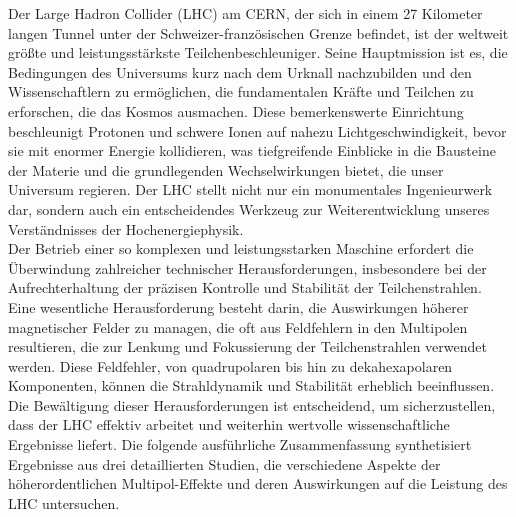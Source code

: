 {
\fontsize{\fontsizesummary}{\fontskipsummary}\selectfont

Der Large Hadron Collider (LHC) am CERN, der sich in einem 27 Kilometer langen Tunnel unter der
Schweizer-französischen Grenze befindet, ist der weltweit größte und leistungsstärkste
Teilchenbeschleuniger. Seine Hauptmission ist es, die Bedingungen des Universums kurz nach dem
Urknall nachzubilden und den Wissenschaftlern zu ermöglichen, die fundamentalen Kräfte und Teilchen
zu erforschen, die das Kosmos ausmachen. Diese bemerkenswerte Einrichtung beschleunigt Protonen und
schwere Ionen auf nahezu Lichtgeschwindigkeit, bevor sie mit enormer Energie kollidieren, was
tiefgreifende Einblicke in die Bausteine der Materie und die grundlegenden Wechselwirkungen bietet,
die unser Universum regieren. Der LHC stellt nicht nur ein monumentales Ingenieurwerk dar, sondern
auch ein entscheidendes Werkzeug zur Weiterentwicklung unseres Verständnisses der
Hochenergiephysik.\\
\indent
Der Betrieb einer so komplexen und leistungsstarken Maschine erfordert die Überwindung zahlreicher
technischer Herausforderungen, insbesondere bei der Aufrechterhaltung der präzisen Kontrolle und
Stabilität der Teilchenstrahlen. Eine wesentliche Herausforderung besteht darin, die Auswirkungen
höherer magnetischer Felder zu managen, die oft aus Feldfehlern in den Multipolen resultieren, die
zur Lenkung und Fokussierung der Teilchenstrahlen verwendet werden. Diese Feldfehler, von
quadrupolaren bis hin zu dekahexapolaren Komponenten, können die Strahldynamik und Stabilität
erheblich beeinflussen. Die Bewältigung dieser Herausforderungen ist entscheidend, um
sicherzustellen, dass der LHC effektiv arbeitet und weiterhin wertvolle wissenschaftliche Ergebnisse
liefert. Die folgende ausführliche Zusammenfassung synthetisiert Ergebnisse aus drei detaillierten
Studien, die verschiedene Aspekte der höherordentlichen Multipol-Effekte und deren Auswirkungen auf
die Leistung des LHC untersuchen.

}
